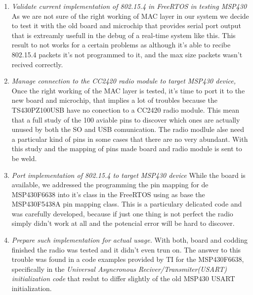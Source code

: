 		\begin{enumerate}
		\item \emph{Validate current implementation of 802.15.4 in FreeRTOS in testing MSP430}\\
		As we are not sure of the right working of MAC layer in our system we decide to test it with the old board and microchip that provides serial port output that is extreamly usefull in the debug of a real-time system like this. This result to not works for a certain problems as although it's able to recibe 802.15.4 packets it's not programmed to it, and the max size packets wasn't recived correctly.\\

		\item\emph{Manage connection to the CC2420 radio module to target MSP430 device,}
		Once the right working of the MAC layer is tested, it's time to port it to the new board and microchip, that implies a lot of troubles because the TS430PZ100USB have no conection to a CC2420 radio module. This mean that a full study of the 100 aviable pins to discover which ones are actually unused by both the SO and USB comunication. The radio modlule alse need a particular kind of pins in some cases that there are no very abundant. With this study and the mapping of pins made board and radio module is sent to be weld.\\

		\item\emph{Port implementation of 802.15.4 to target MSP430 device}
		While the board is available, we addressed the programming the pin mapping for de MSP430F6638 into it's class in the FreeRTOS using as base the MSP430F5438A pin mapping class. This is a particulary delicated code and was carefully developed, because if just one thing is not perfect the radio simply didn't work at all and the potencial error will be hard to discover. \\

		\item\emph{Prepare such implementation for actual usage.}
		With both, board and codding finished the radio was tested and it didn't even trun on. The answer to this trouble was found in a code examples provided by TI for the MSP430F6638, specifically in the \textit{Universal Asyncronous Reciver/Transmiter(USART) initialization code} that reslut to differ slightly of the old MSP430 USART initialization.\\


\end{enumerate}
